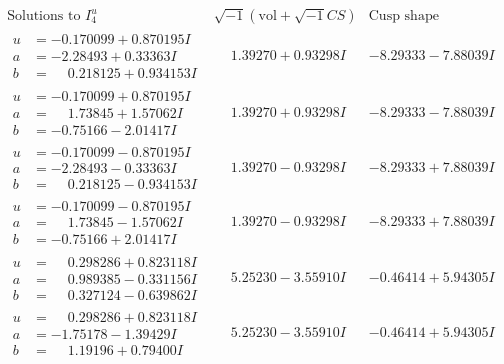 \documentclass[1p]{elsarticle_modified}
\theoremstyle{definition}
\newcommand{\I}{\sqrt{-1}}
\begin{document}
$$\begin{array}{c|c|c}  
\text{Solutions to }I^u_{4}& \I (\text{vol} + \sqrt{-1}CS) & \text{Cusp shape}\\
 \hline 
\begin{aligned}
u &= -0.170099 + 0.870195 I \\
a &= -2.28493 + 0.33363 I \\
b &= \phantom{-}0.218125 + 0.934153 I\end{aligned}
 & \phantom{-}1.39270 + 0.93298 I & -8.29333 - 7.88039 I \\ \hline\begin{aligned}
u &= -0.170099 + 0.870195 I \\
a &= \phantom{-}1.73845 + 1.57062 I \\
b &= -0.75166 - 2.01417 I\end{aligned}
 & \phantom{-}1.39270 + 0.93298 I & -8.29333 - 7.88039 I \\ \hline\begin{aligned}
u &= -0.170099 - 0.870195 I \\
a &= -2.28493 - 0.33363 I \\
b &= \phantom{-}0.218125 - 0.934153 I\end{aligned}
 & \phantom{-}1.39270 - 0.93298 I & -8.29333 + 7.88039 I \\ \hline\begin{aligned}
u &= -0.170099 - 0.870195 I \\
a &= \phantom{-}1.73845 - 1.57062 I \\
b &= -0.75166 + 2.01417 I\end{aligned}
 & \phantom{-}1.39270 - 0.93298 I & -8.29333 + 7.88039 I \\ \hline\begin{aligned}
u &= \phantom{-}0.298286 + 0.823118 I \\
a &= \phantom{-}0.989385 - 0.331156 I \\
b &= \phantom{-}0.327124 - 0.639862 I\end{aligned}
 & \phantom{-}5.25230 - 3.55910 I & -0.46414 + 5.94305 I \\ \hline\begin{aligned}
u &= \phantom{-}0.298286 + 0.823118 I \\
a &= -1.75178 - 1.39429 I \\
b &= \phantom{-}1.19196 + 0.79400 I\end{aligned}
 & \phantom{-}5.25230 - 3.55910 I & -0.46414 + 5.94305 I \\ \hline\begin{aligned}

\end{aligned}
\end{array}$$
\end{document}
